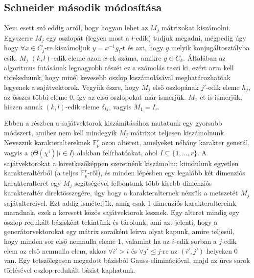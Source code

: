 \subsection{Schneider második módosítása}
\label{subsec:bdssch2}
Nem esett szó eddig arról, hogy hogyan lehet az $M_j$ mátrixokat kiszámolni.
Egyszerre $M_j$ egy oszlopát (legyen most a $l$-edik) tudjuk megadni, mégpedig úgy hogy $\forall x \in C_j$-re kiszámoljuk
$y=x^{-1}g_l$-t és azt, hogy $y$ melyik konjugáltosztályba esik.
$M_j$ $(k,l)$-edik eleme azon $x$-ek száma, amikre $y\in C_k$.
Általában az algoritmus futásának legnagyobb részét ez a számolás teszi ki, ezért arra kell törekednünk, hogy minél kevesebb oszlop kiszámolásával meghatározhatóak legyenek a sajátvektorok.
Vegyük észre, hogy $M_j$ első oszlopának $j'$-edik eleme $h_j$, az összes többi eleme $0$, így az első oszlopokat már ismerjük.
$M_1$-et is ismerjük, hiszen annak $(k,l)$-edik eleme $\delta_{kl}$, vagyis $M_1=I_r$.

Ebben a részben a sajátvektorok kiszámításához mutatunk egy gyorsabb módszert, amihez nem kell mindegyik $M_j$ mátrixot teljesen kiszámolnunk.
Nevezzük karakteraltereknek $\mathbb{F}_p^r$ azon altereit, amelyeket néhány karakter generál, vagyis a $\langle \Theta(\chi^i) | i \in I \rangle$ alakban felírhatóakat, ahol $I \subseteq \{1,\dots,r\}$.
A sajátvektorokat a következőképpen szeretnénk kiszámolni:
kiindulunk egyetlen karakteraltérből (a teljes $\mathbb{F}_p^r$-ről), és minden lépésben egy legalább két dimenziós karakteralteret egy $M_j$ segítségével felbontunk több kisebb dimenziós karakteraltér direktösszegére,
úgy hogy a karakteralternek nézzük a metszetét $M_j$ sajátaltereivel.
Ezt addig ismételjük, amíg csak 1-dimenziós karakteraltereink maradnak, ezek a keresett közös sajátvektorok lesznek.
Egy alteret mindig egy oszlop-redukált bázisként tekintünk és tárolunk, ami azt jelenti, hogy a generátorvektorokat egy mátrix soraiként leírva olyat kapunk,
amire teljesül, hogy minden sor első nemnulla eleme $1$, valamint ha az $i$-edik sorban a $j$-edik elem az első nemnulla elem, akkor $\forall i'>i$ és $\forall j'\le j$-re az $(i',j')$ helyeken 0 van.
Egy tetszőlegesen megadott bázisból Gauss-eliminációval, majd az üres sorok törlésével oszlop-redukált bázist kaphatunk.

